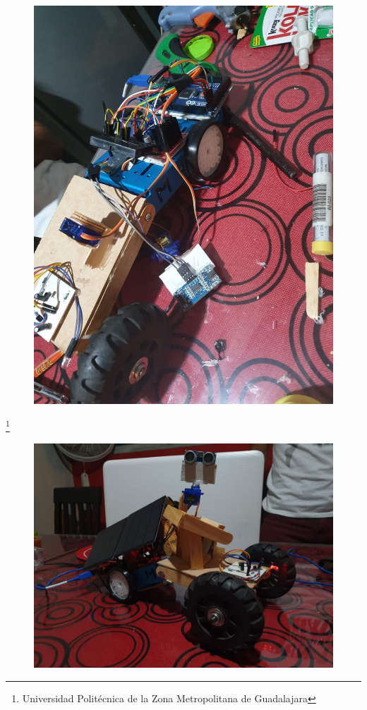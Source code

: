 \documentclass[11pt,a4paper]{article}
\begin{document}
\begin{figure}[hbtp]
\centering
\includegraphics[scale=0.2]{Pictures/Armado2.jpeg}
\caption{}
\end{figure}
\footnote{Universidad Politécnica de la Zona Metropolitana de Guadalajara}

\newpage
\begin{figure}[hbtp]
\centering
\includegraphics[scale=0.2]{Pictures/Armado3.jpeg}
\caption{}
\end{figure}
\end{document}
